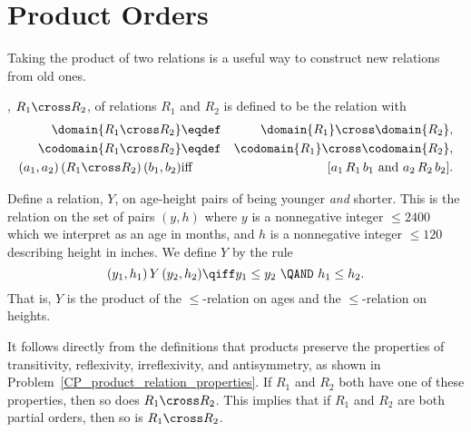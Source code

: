 \begin{problems}
\practiceproblems
{}

\classproblems
{}

\homeworkproblems
{}

\examproblems
{}

\end{problems}


\section{Product Orders}\label{prodsec}

Taking the product of two relations is a useful way to construct new
relations from old ones.

\begin{definition}\label{productrel}
, $R_1 \cross R_2$, of relations
$R_1$ and $R_2$ is defined to be the relation with
\begin{eqnarray*}
\domain{R_1 \cross R_2} &\eqdef& \domain{R_1} \cross \domain{R_2},\\
\codomain{R_1 \cross R_2} &\eqdef& \codomain{R_1} \cross \codomain{R_2},\\
(a_1,a_2)\, (R_1 \cross R_2)\, (b_1,b_2) &\text{iff}& [a_1\, R_1\, b_1
\text{ and } a_2\, R_2\, b_2].
\end{eqnarray*}

\end{definition}

\begin{example}\label{Y}
Define a relation, $Y$, on age-height pairs of being younger \emph{and}
shorter.  This is the relation on the set of pairs $(y,h)$ where $y$ is a
nonnegative integer $\le 2400$ which we interpret as an age in months, and $h$
is a nonnegative integer $\le 120$ describing height in inches.  We define $Y$
by the rule
\[
(y_1,h_1)\, Y\, (y_2,h_2) \qiff y_1 \le y_2\ \QAND\ h_1 \le h_2.
\]
That is, $Y$ is the product of the $\le$-relation on ages and the
$\le$-relation on heights.
\end{example}

It follows directly from the definitions that products preserve the
properties of transitivity, reflexivity, irreflexivity, and
antisymmetry, as shown in
Problem~\ref{CP_product_relation_properties}.  If $R_1$ and
$R_2$ both have one of these properties, then so does $R_1 \cross
R_2$.  This implies that if $R_1$ and $R_2$ are both partial orders,
then so is $R_1 \cross R_2$.

